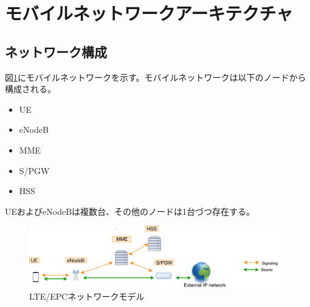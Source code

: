 \documentclass[a4j]{ujarticle}
\begin{document}
%
%
%
%
%
%






\clearpage
\section{モバイルネットワークアーキテクチャ}
  \subsection{ネットワーク構成}
    図\ref{networkmodel}にモバイルネットワークを示す。モバイルネットワークは以下のノードから構成される。
    \begin{itemize}
      \item UE
      \item eNodeB
      \item MME
      \item S/PGW
      \item HSS
    \end{itemize}
    UEおよびeNodeBは複数台、その他のノードは1台づつ存在する。
    \begin{figure}[htbp]
      \centering
      \includegraphics[width=0.7\hsize]{networkmodel.pdf}
      \caption{LTE/EPCネットワークモデル}
      \label{networkmodel}
    \end{figure}
\end{document}
